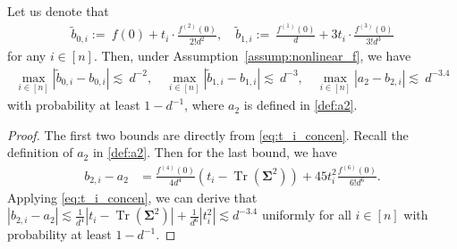 \documentclass[twoside,11pt]{article}
\def\bSigma{{\boldsymbol \Sigma}}
\newcommand{\Tr}{\operatorname{Tr}}
\newcommand{\1}{\mathbf{1}}
\begin{document}
\begin{lemma}\label{lemm:b_k,i}
Let us denote that 
\begin{align}
    \widetilde b_{0,i}:=~f(0)+t_{i}\cdot \frac{f^{(2)}(0)}{2!d^2}, \quad 
    \widetilde b_{1,i}:=~\frac{f^{(1)}(0)}{ d }+3t_{i}\cdot \frac{f^{(3)}(0)}{3!d^3}\label{eq:tildeb1i}
\end{align}
for any $i\in [n]$. Then, under Assumption~\ref{assump:nonlinear_f}, we have
  \begin{align}
    \max_{i\in [n]}|\widetilde b_{0,i}-b_{0,i}|\lesssim~ d^{-2} ,\quad 
    \max_{i\in [n]}|\widetilde b_{1,i}-b_{1,i}|\lesssim~ d^{-3}, \quad 
     \max_{i\in [n]}| a_{2}-b_{2,i}|\lesssim~ d^{-3.4}
\end{align}
with probability at least $1-d^{-1}$, where $ a_2$ is defined in \eqref{def:a2}.
\end{lemma}
\begin{proof}
The first two bounds are directly from \eqref{eq:t_i_concen}. Recall the definition of $a_2$ in \eqref{def:a2}. Then for the last bound, we have
\begin{align}
b_{2,i} -a_{2} & = \frac{f^{(4)}(0)}{4d^4}(t_i-\Tr(\bSigma^2))+45t_{i}^2\frac{f^{(6)}(0)}{6!d^6}.  
\end{align}
Applying \eqref{eq:t_i_concen}, we can derive that 
 $|b_{2,i} -a_{2}| \lesssim \frac{1}{ d^4}|t_i-\Tr(\bSigma^2)|+\frac{1}{ d^6}|t_{i}^2| \lesssim d^{-3.4}$
uniformly for all $i\in [n]$ with probability at least $1-d^{-1}$. 
\end{proof}
\end{document}
